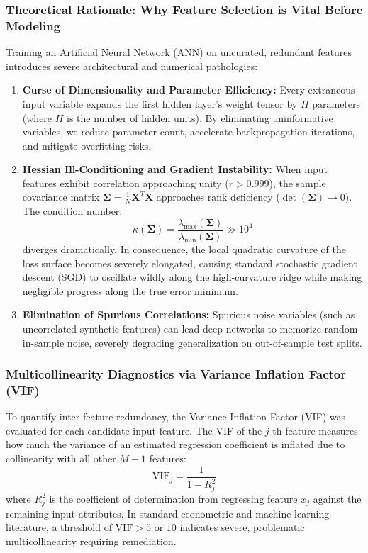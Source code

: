 \documentclass[conference]{IEEEtran}
\begin{document}
\subsubsection{Theoretical Rationale: Why Feature Selection is Vital Before Modeling}
Training an Artificial Neural Network (ANN) on uncurated, redundant features introduces severe architectural and numerical pathologies:
\begin{enumerate}
    \item \textbf{Curse of Dimensionality and Parameter Efficiency:} Every extraneous input variable expands the first hidden layer's weight tensor by $H$ parameters (where $H$ is the number of hidden units). By eliminating uninformative variables, we reduce parameter count, accelerate backpropagation iterations, and mitigate overfitting risks.
    \item \textbf{Hessian Ill-Conditioning and Gradient Instability:} When input features exhibit correlation approaching unity ($r > 0.999$), the sample covariance matrix $\mathbf{\Sigma} = \frac{1}{N}\mathbf{X}^T\mathbf{X}$ approaches rank deficiency ($\det(\mathbf{\Sigma}) \to 0$). The condition number:
    \begin{equation}
        \kappa(\mathbf{\Sigma}) = \frac{\lambda_{\max}(\mathbf{\Sigma})}{\lambda_{\min}(\mathbf{\Sigma})} \gg 10^4
    \end{equation}
    diverges dramatically. In consequence, the local quadratic curvature of the loss surface becomes severely elongated, causing standard stochastic gradient descent (SGD) to oscillate wildly along the high-curvature ridge while making negligible progress along the true error minimum.
    \item \textbf{Elimination of Spurious Correlations:} Spurious noise variables (such as uncorrelated synthetic features) can lead deep networks to memorize random in-sample noise, severely degrading generalization on out-of-sample test splits.
\end{enumerate}

\subsubsection{Multicollinearity Diagnostics via Variance Inflation Factor (VIF)}
To quantify inter-feature redundancy, the Variance Inflation Factor (VIF) was evaluated for each candidate input feature. The VIF of the $j$-th feature measures how much the variance of an estimated regression coefficient is inflated due to collinearity with all other $M-1$ features:
\begin{equation}
    \text{VIF}_j = \frac{1}{1 - R_j^2}
\end{equation}
where $R_j^2$ is the coefficient of determination from regressing feature $x_j$ against the remaining input attributes. In standard econometric and machine learning literature, a threshold of $\text{VIF} > 5$ or $10$ indicates severe, problematic multicollinearity requiring remediation.
\end{document}
